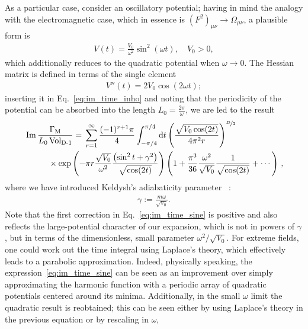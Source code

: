 \documentclass[12pt,a4paper]{article}
\numberwithin{equation}{section}
\numberwithin{equation}{section}
\begin{document}
As a particular case, consider an oscillatory potential; having in mind the analogy with the electromagnetic case, which in essence is $(F^2)_{\mu\nu}\to \Omega_{\mu\nu}$, a plausible form is
\begin{align}
    V(t)=\frac{V_0}{\omega^2} \sin^2(\omega t), \quad V_0>0,
\end{align}
which additionally reduces to the quadratic potential when $\omega\to 0$.
The Hessian matrix is defined in terms of the single element
\begin{align}
    V''(t)= 2{V_0} \cos(2\omega t);
\end{align}
inserting it  in Eq.~\eqref{eq:im_time_inho} and noting that the periodicity of the potential can be absorbed into the length $L_0=\frac{2\pi}{\omega}$,
we are led to the result
\begin{align}\label{eq:im_time_sine}
    \begin{split}
&\operatorname{Im} \frac{\Gamma_{\rm M}}{L_0\operatorname{Vol_{\rm D-1}}} 
= \, \sum_{r=1}^{\infty}  \frac{(-1)^{r+1}\pi}{4} \int^{\pi/4}_{-\pi/4} {\rm d}t \left(\frac{\sqrt{V_0 \cos(2 t)} }{ 4\pi^2 r }\right)^{\nicefrac{D}{2}}
\\
&\hspace{1cm} \times \mathrm{exp}\left(- \pi r \frac{ \sqrt{V_0}}{\omega^2}  \frac{\left( \sin^2 t+\gamma^2\right)}{ \sqrt{ \cos(2 t)}}\right)  \left(1+\frac{\pi^3}{36} \frac{\omega^2}{ \sqrt{V_0} } \frac{1}{\sqrt{\cos (2 t)}}+\cdots\right) \,,
\end{split}
\end{align}
where we have introduced Keldysh's adiabaticity parameter~\cite{Keldysh:1965ojf} :
\begin{align}
    \gamma:=\frac{m\omega}{\sqrt{V_0}}.
\end{align}
Note that the first correction in Eq.~\eqref{eq:im_time_sine} is positive and also reflects the large-potential character of our expansion, which is not in powers of $\gamma$, but in terms of the dimensionless, small parameter $\omega^2/\sqrt{V_0}$. For extreme fields,  one could  work out the time integral using Laplace's theory, which effectively leads to a parabolic approximation. Indeed, physically speaking, the expression~\eqref{eq:im_time_sine} can be seen as an improvement over simply approximating the harmonic function with a periodic array of quadratic potentials centered around its minima.
Additionally, in the small $\omega$ limit the  quadratic result is  reobtained; this can be seen either by using Laplace's theory in the previous equation or by rescaling in $\omega$,
\end{document}
